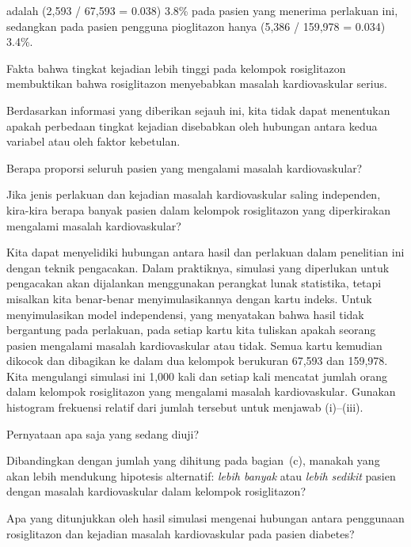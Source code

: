 {\begin{parts}
\begin{subparts}
adalah (2,593 / 67,593 = 0.038) 3.8\% pada pasien yang menerima perlakuan ini,
sedangkan pada pasien pengguna pioglitazon hanya
(5,386 / 159,978 = 0.034) 3.4\%.
\item Fakta bahwa tingkat kejadian lebih tinggi pada kelompok rosiglitazon
membuktikan bahwa rosiglitazon menyebabkan masalah kardiovaskular serius.
\item Berdasarkan informasi yang diberikan sejauh ini, kita tidak dapat
menentukan apakah perbedaan tingkat kejadian disebabkan oleh hubungan antara
kedua variabel atau oleh faktor kebetulan.
\end{subparts}
\item Berapa proporsi seluruh pasien yang mengalami masalah kardiovaskular?
\item Jika jenis perlakuan dan kejadian masalah kardiovaskular saling
independen, kira-kira berapa banyak pasien dalam kelompok rosiglitazon yang
diperkirakan mengalami masalah kardiovaskular?
\item Kita dapat menyelidiki hubungan antara hasil dan perlakuan dalam penelitian
ini dengan teknik pengacakan. Dalam praktiknya, simulasi yang diperlukan untuk
pengacakan akan dijalankan menggunakan perangkat lunak statistika, tetapi
misalkan kita benar-benar menyimulasikannya dengan kartu indeks. Untuk
menyimulasikan model independensi, yang menyatakan bahwa hasil tidak bergantung
pada perlakuan, pada setiap kartu kita tuliskan apakah seorang pasien mengalami
masalah kardiovaskular atau tidak. Semua kartu kemudian dikocok dan dibagikan
ke dalam dua kelompok berukuran 67,593 dan 159,978. Kita mengulangi simulasi ini
1,000 kali dan setiap kali mencatat jumlah orang dalam kelompok rosiglitazon
yang mengalami masalah kardiovaskular. Gunakan histogram frekuensi relatif
dari jumlah tersebut untuk menjawab (i)--(iii).
\end{parts}
\begin{minipage}[c]{0.5\textwidth}
\begin{subparts}
\item Pernyataan apa saja yang sedang diuji?
\item Dibandingkan dengan jumlah yang dihitung pada bagian~(c), manakah yang
akan lebih mendukung hipotesis alternatif: \textit{lebih banyak} atau
\textit{lebih sedikit} pasien dengan masalah kardiovaskular dalam kelompok
rosiglitazon?
\item Apa yang ditunjukkan oleh hasil simulasi mengenai hubungan antara
penggunaan rosiglitazon dan kejadian masalah kardiovaskular pada pasien diabetes?
\end{subparts}

\end{minipage}}
